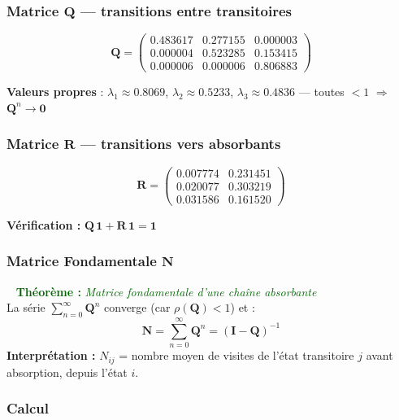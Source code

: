 \documentclass[11pt,a4paper]{article}
\newenvironment{thmbox}[1]{%
  \vspace{3pt}\begin{framed}
  \noindent{\color{DarkGreen}\rule{0.3cm}{3pt}}~%
  \textcolor{DarkGreen}{\textbf{Théorème :} \textit{#1}}\\[3pt]}
  {\end{framed}\vspace{3pt}}
\newcommand{\mat}[1]{\mathbf{#1}}
\begin{document}
\subsubsection{Matrice \texorpdfstring{$\mat{Q}$}{Q} --- transitions entre transitoires}

\[
  \mat{Q} =
  \begin{pmatrix}
    0.483617 & 0.277155 & 0.000003 \\
    0.000004 & 0.523285 & 0.153415 \\
    0.000006 & 0.000006 & 0.806883
  \end{pmatrix}
\]

\textbf{Valeurs propres} : $\lambda_1\!\approx\!0.8069$,
$\lambda_2\!\approx\!0.5233$, $\lambda_3\!\approx\!0.4836$
--- toutes $<1$ $\Rightarrow$ $\mat{Q}^n\to\mat{0}$ \checkmark

\subsubsection{Matrice \texorpdfstring{$\mat{R}$}{R} --- transitions vers absorbants}

\[
  \mat{R} =
  \begin{pmatrix}
    0.007774 & 0.231451 \\
    0.020077 & 0.303219 \\
    0.031586 & 0.161520
  \end{pmatrix}
\]

\textbf{Vérification :} $\mat{Q}\,\mathbf{1} + \mat{R}\,\mathbf{1}
= \mathbf{1}$ \checkmark

\subsubsection{Matrice Fondamentale \texorpdfstring{$\mat{N}$}{N}}

\begin{thmbox}{Matrice fondamentale d'une chaîne absorbante}
La série $\sum_{n=0}^{\infty}\mat{Q}^n$ converge (car $\rho(\mat{Q})<1$)
et :
\[
  \boxed{\mat{N} = \sum_{n=0}^{\infty}\mat{Q}^n
  = (\mat{I}-\mat{Q})^{-1}}
\]
\textbf{Interprétation :} $N_{ij}$ = nombre moyen de visites de l'état
transitoire $j$ avant absorption, depuis l'état $i$.
\end{thmbox}

\subsubsection{Calcul}
\end{document}
